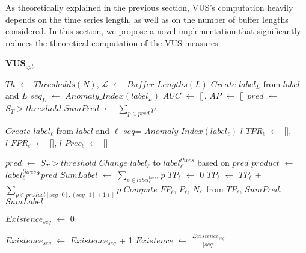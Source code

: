 As theoretically explained in the previous section, VUS's computation heavily depends on the time series length, as well as on the number of buffer lengths considered. In this section, we propose a novel implementation that significantly reduces the theoretical computation of the VUS measures.
 

\begin{algorithm}[tb]
{\small
    \caption{\textbf{\textbf{VUS}$_{opt}$}}\label{alg:VUS_opt}
    \BlankLine
    $Th$ $\leftarrow$ $Thresholds(N)$,
    $\mathcal{L}$ $\leftarrow$ $Buffer\_Lengths(L)$\;
    $Create$ $label_L$ from $label$ and $L$\;
    $seq_L$ $\leftarrow$ $Anomaly\_Index(label_L)$\;
    $AUC$ $\leftarrow$ [], 
    $AP$ $\leftarrow$ []\;
    {\label{line_vus:static_b}
        $pred$ $\leftarrow$ $S_{T}>threshold$\;
        $SumPred$ $\leftarrow$ $\sum_{p\in pred} p$\;
    }\label{line_vus:static_e}
    {\label{line_vus:dyn_b}
        $Create$ $label_\ell$ from $label$ and $\ell$\;
        $seq$= $Anomaly\_Index(label_\ell)$\;
        $l\_TPR_{\ell}$ $\leftarrow$ [], 
        $l\_FPR_{\ell}$ $\leftarrow$ [], 
        $l\_Prec_{\ell}$ $\leftarrow$ []\;
        {   
            $pred$ $\leftarrow$ $S_{T}>threshold$\;
            $Change$ $label_\ell$ to $label_\ell^{thres}$ based on $pred$\;
            $product$ $\leftarrow$ $label_\ell^{thres}$*$pred$\;
            $SumLabel$ $\leftarrow$ $\sum_{p\in label_\ell^{thres}} p$\;
            $TP_\ell$ $\leftarrow$ 0\;
            {
                $TP_\ell$ $\leftarrow$ $TP_\ell$ + $\sum_{p\in product[seg[0]:(seg[1]+1)]}p$
            }
            $Compute$ $FP_\ell$, $P_\ell$, $N_\ell$\ from $TP_\ell$, $SumPred$, $SumLabel$\;
            
            $Existence_{seq}$ $\leftarrow$ 0\;
            {
                {
                    $Existence_{seq}$ $\leftarrow$ $Existence_{seq}$ + 1
                }
                $Existence$ $\leftarrow$ $\frac{Existence_{seq}}{|seq|}$
                  
}}}}
\end{algorithm}
